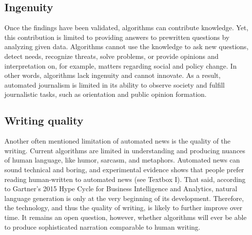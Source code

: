 \documentclass[notoc, symmetric, nobib, nols]{towcenter-guideto-book}
\begin{document}
\subsection{Ingenuity}

Once the findings have been validated, algorithms can contribute knowledge. Yet, this contribution is limited to providing answers to prewritten questions by analyzing given data. Algorithms cannot use the knowledge to ask new questions, detect needs, recognize threats, solve problems, or provide opinions and interpretation on, for example, matters regarding social and policy change. In other words, algorithms lack ingenuity and cannot innovate. As a result, automated journalism is limited in its ability to observe society and fulfill journalistic tasks, such as orientation and public opinion formation.\autocite{latar15}  

\subsection{Writing quality}

Another often mentioned limitation of automated news is the quality of the writing. Current algorithms are limited in understanding and producing nuances of human language, like humor, sarcasm, and metaphors. Automated news can sound technical and boring, and experimental evidence shows that people prefer reading human-written to automated news (see Textbox I). That said, according to Gartner's 2015 Hype Cycle for Business Intelligence and Analytics, natural language generation is only at the very beginning of its development.\autocite{schlegel15} Therefore, the technology, and thus the quality of writing, is likely to further improve over time. It remains an open question, however, whether algorithms will ever be able to produce sophisticated narration comparable to human writing.\autocite{latar15}
\end{document}
